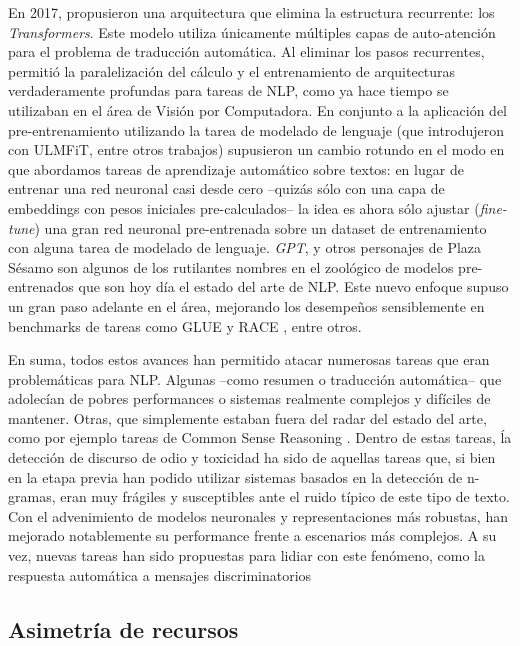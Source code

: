 En 2017, \citet{vaswani2017attention} propusieron una arquitectura que elimina la estructura recurrente: los \emph{Transformers}. Este modelo utiliza únicamente múltiples capas de auto-atención para el problema de traducción automática. Al eliminar los pasos recurrentes, permitió la paralelización del cálculo y el entrenamiento de arquitecturas verdaderamente profundas para tareas de NLP, como ya hace tiempo se utilizaban en el área de Visión por Computadora. En conjunto a la aplicación del pre-entrenamiento utilizando la tarea de modelado de lenguaje (que introdujeron \citet{howard-ruder-2018-universal} con ULMFiT, entre otros trabajos) supusieron un cambio rotundo en el modo en que abordamos tareas de aprendizaje automático sobre textos: en lugar de entrenar una red neuronal casi desde cero --quizás sólo con una capa de embeddings con pesos iniciales pre-calculados-- la idea es ahora sólo ajustar (\emph{fine-tune}) una gran red neuronal pre-entrenada sobre un dataset de entrenamiento con alguna tarea de modelado de lenguaje. \emph{GPT}, \bert{} y otros personajes de Plaza Sésamo son algunos de los rutilantes nombres en el zoológico de modelos pre-entrenados que son hoy día el estado del arte de NLP. Este nuevo enfoque supuso un gran paso adelante en el área, mejorando los desempeños sensiblemente en benchmarks de tareas como GLUE \cite{wang-etal-2018-glue} y RACE \cite{lai2017race}, entre otros.

En suma, todos estos avances han permitido atacar numerosas tareas que eran problemáticas para NLP. Algunas --como resumen o traducción automática-- que adolecían de pobres performances o sistemas realmente complejos y difíciles de mantener. Otras, que simplemente estaban fuera del radar del estado del arte, como por ejemplo tareas de Common Sense Reasoning . Dentro de estas tareas, ĺa detección de discurso de odio y toxicidad ha sido de aquellas tareas que, si bien en la etapa previa han podido utilizar sistemas basados en la detección de n-gramas, eran muy frágiles y susceptibles ante el ruido típico de este tipo de texto. Con el advenimiento de modelos neuronales y representaciones más robustas, han mejorado notablemente su performance frente a escenarios más complejos. A su vez, nuevas tareas han sido propuestas para lidiar con este fenómeno, como la respuesta automática a mensajes discriminatorios   

\subsection{Asimetría de recursos}

